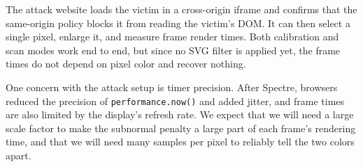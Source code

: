 The attack website loads the victim in a cross-origin iframe and confirms that the same-origin policy blocks it from reading the victim's DOM. It can then select a single pixel, enlarge it, and measure frame render times. Both calibration and scan modes work end to end, but since no SVG filter is applied yet, the frame times do not depend on pixel color and recover nothing.

One concern with the attack setup is timer precision. After Spectre, browsers reduced the precision of \texttt{performance.now()} and added jitter, and frame times are also limited by the display's refresh rate. We expect that we will need a large scale factor to make the subnormal penalty a large part of each frame's rendering time, and that we will need many samples per pixel to reliably tell the two colors apart.
